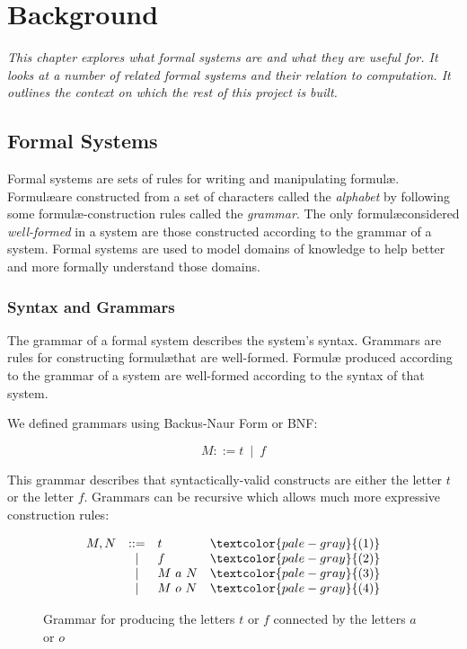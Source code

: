 
\chapter{Background}\label{chapter:background}

\textit{
This chapter explores what \emph{formal systems} are and what they are useful for. 
It looks at a number of related formal systems and their relation to computation. 
It outlines the context on which the rest of this project is built.
}


\section{Formal Systems}

Formal systems are sets of rules for writing and manipulating
formul\ae. Formul\ae are constructed from a set of characters called the
\emph{alphabet} by following some formul\ae-construction rules called
the \emph{grammar}. The only formul\ae considered \emph{well-formed} in
a system are those constructed according to the grammar of a system.
Formal systems are used to model domains of knowledge to help better
and more formally understand those domains.

\subsection{Syntax and Grammars}

The grammar of a formal system describes the system's syntax. Grammars are 
rules for constructing formul\ae that are well-formed. Formul\ae
produced according to the grammar of a system are well-formed according to 
the syntax of that system.

We defined grammars using Backus-Naur Form or BNF:

\[
  M ::= t\ \mid\ f
\]

This grammar describes that syntactically-valid constructs are either the letter $t$ or the letter $f$. 
Grammars can be recursive which allows much more expressive construction rules:

\begin{figure}[!h]\label{fig:tf-grammar}
\[
  \begin{array}{lclr}
    M,N&::=&t&\textcolor{pale-gray}{(1)} \\
      &|&f&\textcolor{pale-gray}{(2)} \\
      &|&M\ a\ N&\textcolor{pale-gray}{(3)} \\
      &|&M\ o\ N&\textcolor{pale-gray}{(4)}
  \end{array}
\]
\caption{Grammar for producing the letters $t$ or $f$ connected by the letters $a$ or $o$}
\end{figure}

